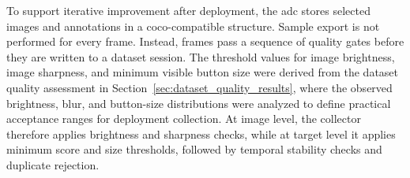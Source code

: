 To support iterative improvement after deployment, the \gls{adc} stores
selected images and annotations in a \gls{coco}-compatible structure. Sample export
is not performed for every frame. Instead, frames pass a sequence of quality gates
before they are written to a dataset session. The threshold values for image
brightness, image sharpness, and minimum visible button size were derived from the
dataset quality assessment in Section~\ref{sec:dataset_quality_results}, where the
observed brightness, blur, and button-size distributions were analyzed to define
practical acceptance ranges for deployment collection. At image level, the collector
therefore applies brightness and sharpness checks, while at target level it applies
minimum score and size thresholds, followed by temporal stability checks and
duplicate rejection.

